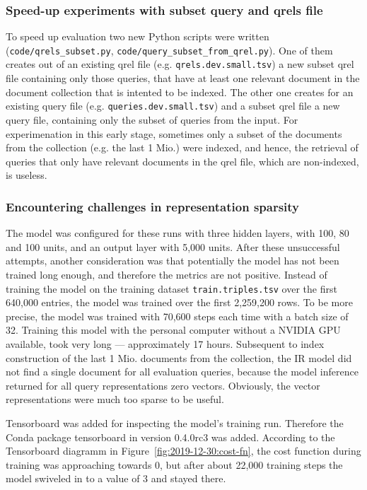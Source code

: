 \subsubsection*{Speed-up experiments with subset query and qrels file}
To speed up evaluation two new Python scripts were written
    (\verb|code/qrels_subset.py|, \verb|code/query_subset_from_qrel.py|).
One of them creates out of an existing qrel file (e.g. \verb|qrels.dev.small.tsv|)
    a new subset qrel file containing only those queries, that have at least one 
    relevant document in the document collection that is intented to be indexed.
The other one creates for an existing query file (e.g. \verb|queries.dev.small.tsv|)
    and a subset qrel file a new query file, containing only the subset of queries from the input.
For experimenation in this early stage, sometimes only a subset of the documents from the 
    collection (e.g. the last 1 Mio.) were indexed, and hence, 
    the retrieval of queries that only have relevant documents in the qrel file, which are non-indexed,
    is useless.

\subsubsection*{Encountering challenges in representation sparsity}
The model was configured for these runs with three hidden layers, with 100, 80 and 100 units,
    and an output layer with 5,000 units.
After these unsuccessful attempts, another consideration was that potentially the model has not been trained
    long enough, and therefore the metrics are not positive.
Instead of training the model on the training dataset \verb|train.triples.tsv| over the first 640,000 entries,
    the model was trained over the first 2,259,200 rows.
To be more precise, the model was trained with 70,600 steps each time with a batch size of 32.
Training this model with the personal computer without a NVIDIA GPU available, took very long --- 
    approximately 17 hours.
Subsequent to index construction of the last 1 Mio. documents from the collection,
    the IR model did not find a single document for all evaluation queries,
    because the model inference returned for all query representations zero vectors.
Obviously, the vector representations were much too sparse to be useful.

Tensorboard was added for inspecting the model's training run.
Therefore the Conda package tensorboard in version 0.4.0rc3 was added.
According to the Tensorboard diagramm in Figure~\ref{fig:2019-12-30:cost-fn}, the cost function during training
    was approaching towards 0, but after about 22,000 training steps the model
    swiveled in to a value of 3 and stayed there.

